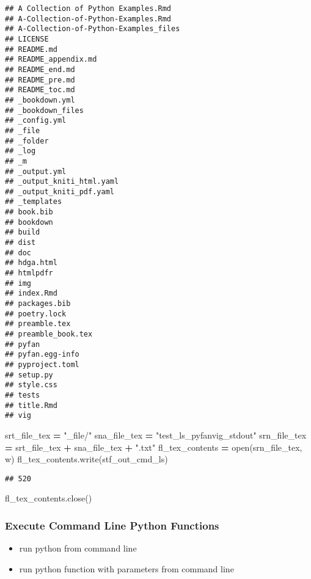 \documentclass[
]{book}
\newenvironment{Shaded}{\begin{snugshade}}{\end{snugshade}}
\newcommand{\BuiltInTok}[1]{#1}
\newcommand{\NormalTok}[1]{#1}
\newcommand{\OperatorTok}[1]{\textcolor[rgb]{0.81,0.36,0.00}{\textbf{#1}}}
\newcommand{\StringTok}[1]{\textcolor[rgb]{0.31,0.60,0.02}{#1}}
\providecommand{\tightlist}{%
  \setlength{\itemsep}{0pt}\setlength{\parskip}{0pt}}
\begin{document}
\begin{verbatim}
## A Collection of Python Examples.Rmd
## A-Collection-of-Python-Examples.Rmd
## A-Collection-of-Python-Examples_files
## LICENSE
## README.md
## README_appendix.md
## README_end.md
## README_pre.md
## README_toc.md
## _bookdown.yml
## _bookdown_files
## _config.yml
## _file
## _folder
## _log
## _m
## _output.yml
## _output_kniti_html.yaml
## _output_kniti_pdf.yaml
## _templates
## book.bib
## bookdown
## build
## dist
## doc
## hdga.html
## htmlpdfr
## img
## index.Rmd
## packages.bib
## poetry.lock
## preamble.tex
## preamble_book.tex
## pyfan
## pyfan.egg-info
## pyproject.toml
## setup.py
## style.css
## tests
## title.Rmd
## vig
\end{verbatim}

\begin{Shaded}
\begin{Highlighting}[]
\NormalTok{srt\_file\_tex }\OperatorTok{=} \StringTok{"\_file/"}
\NormalTok{sna\_file\_tex }\OperatorTok{=} \StringTok{"test\_ls\_pyfanvig\_stdout"}
\NormalTok{srn\_file\_tex }\OperatorTok{=}\NormalTok{ srt\_file\_tex }\OperatorTok{+}\NormalTok{ sna\_file\_tex }\OperatorTok{+} \StringTok{".txt"}
\NormalTok{fl\_tex\_contents }\OperatorTok{=} \BuiltInTok{open}\NormalTok{(srn\_file\_tex, }\StringTok{\textquotesingle{}w\textquotesingle{}}\NormalTok{)}
\NormalTok{fl\_tex\_contents.write(stf\_out\_cmd\_ls)}
\end{Highlighting}
\end{Shaded}

\begin{verbatim}
## 520
\end{verbatim}

\begin{Shaded}
\begin{Highlighting}[]
\NormalTok{fl\_tex\_contents.close()}
\end{Highlighting}
\end{Shaded}

\hypertarget{execute-command-line-python-functions}{%
\subsubsection{Execute Command Line Python Functions}\label{execute-command-line-python-functions}}

\begin{itemize}
\tightlist
\item
  run python from command line
\item
  run python function with parameters from command line
\end{itemize}
\end{document}

